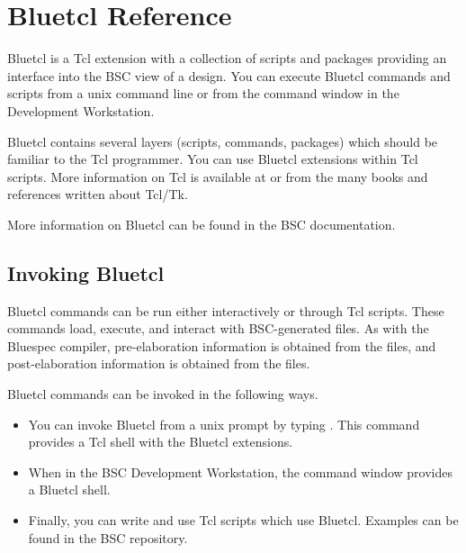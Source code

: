 
\section{Bluetcl Reference}
\label{tcl-commands}

Bluetcl is a Tcl extension with a collection of scripts and packages 
providing an interface into the BSC view of a design.
You can execute Bluetcl commands and scripts from a
unix command line or from the command window in the Development
Workstation.

Bluetcl contains several layers (scripts, commands, packages) which
should be familiar to  the Tcl
programmer.  You can use Bluetcl extensions within Tcl scripts.
More information on Tcl is available at  or
from the many books and references written about Tcl/Tk.

More information on Bluetcl can be found in the BSC documentation.


\subsection{Invoking Bluetcl}

Bluetcl commands can be run either interactively or through Tcl
scripts.  These commands load, execute, and interact with
BSC-generated  files.   As with the Bluespec compiler,
pre-elaboration  information is obtained
from the  files, and post-elaboration information is
obtained from the  files.  

Bluetcl commands can be invoked in the following  ways.
\begin{itemize}
\item You can invoke Bluetcl from a unix prompt by typing
.  This command provides a Tcl shell with the Bluetcl
extensions.
\item When in the BSC Development Workstation, the command window
provides a Bluetcl shell.
\item Finally, you can write and use Tcl scripts which use Bluetcl.
Examples can be found in the BSC repository.
\end{itemize}


